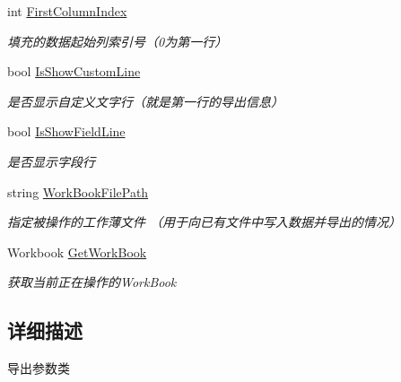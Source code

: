\begin{DoxyCompactItemize}
int \hyperlink{class_x_c_l_net_tools_1_1_data_handler_1_1_out_put_param_class_ad7f400014e22c2935b3acd107b700301}{First\-Column\-Index}
\begin{DoxyCompactList}\small\item\em 填充的数据起始列索引号（0为第一行） \end{DoxyCompactList}\item 
bool \hyperlink{class_x_c_l_net_tools_1_1_data_handler_1_1_out_put_param_class_a516e2da305a873914ecfc1c1ac2f47f2}{Is\-Show\-Custom\-Line}
\begin{DoxyCompactList}\small\item\em 是否显示自定义文字行（就是第一行的导出信息） \end{DoxyCompactList}\item 
bool \hyperlink{class_x_c_l_net_tools_1_1_data_handler_1_1_out_put_param_class_a6ac5480b872823a988c8f046bcdb7f41}{Is\-Show\-Field\-Line}
\begin{DoxyCompactList}\small\item\em 是否显示字段行 \end{DoxyCompactList}\item 
string \hyperlink{class_x_c_l_net_tools_1_1_data_handler_1_1_out_put_param_class_ac24509285a5c4a9bec38099e2070aeba}{Work\-Book\-File\-Path}
\begin{DoxyCompactList}\small\item\em 指定被操作的工作薄文件 （用于向已有文件中写入数据并导出的情况） \end{DoxyCompactList}\item 
Workbook \hyperlink{class_x_c_l_net_tools_1_1_data_handler_1_1_out_put_param_class_a718ce1fcf56ee9b9a8e17c1dc33b77e2}{Get\-Work\-Book}
\begin{DoxyCompactList}\small\item\em 获取当前正在操作的\-Work\-Book \end{DoxyCompactList}\end{DoxyCompactItemize}


\subsection{详细描述}
导出参数类 



